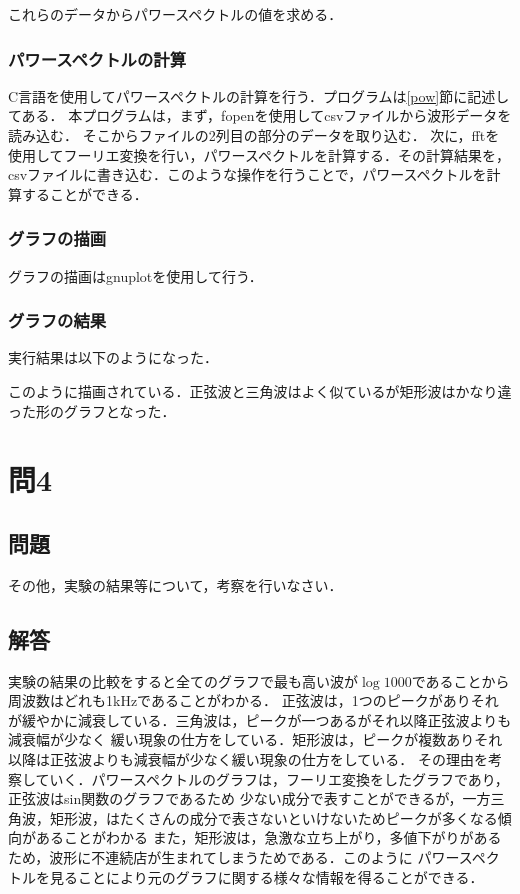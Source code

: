 これらのデータからパワースペクトルの値を求める．
\subsubsection{パワースペクトルの計算}
C言語を使用してパワースペクトルの計算を行う．プログラムは\ref{pow}節に記述してある．
本プログラムは，まず，fopenを使用してcsvファイルから波形データを読み込む．
そこからファイルの2列目の部分のデータを取り込む．
次に，fftを使用してフーリエ変換を行い，パワースペクトルを計算する．その計算結果を，
csvファイルに書き込む．このような操作を行うことで，パワースペクトルを計算することができる．
\subsubsection{グラフの描画}
グラフの描画はgnuplotを使用して行う．
\subsubsection{グラフの結果}
実行結果は以下のようになった．

このように描画されている．正弦波と三角波はよく似ているが矩形波はかなり違った形のグラフとなった．
    \section{問4} \label{sec:absatract}
\subsection{問題}
その他，実験の結果等について，考察を行いなさい．
\subsection{解答}
実験の結果の比較をすると全てのグラフで最も高い波が$\log 1000$であることから周波数はどれも1kHzであることがわかる．
正弦波は，1つのピークがありそれが緩やかに減衰している．三角波は，ピークが一つあるがそれ以降正弦波よりも減衰幅が少なく
緩い現象の仕方をしている．矩形波は，ピークが複数ありそれ以降は正弦波よりも減衰幅が少なく緩い現象の仕方をしている．
その理由を考察していく．パワースペクトルのグラフは，フーリエ変換をしたグラフであり，正弦波はsin関数のグラフであるため
少ない成分で表すことができるが，一方三角波，矩形波，はたくさんの成分で表さないといけないためピークが多くなる傾向があることがわかる
また，矩形波は，急激な立ち上がり，多値下がりがあるため，波形に不連続店が生まれてしまうためである．このように
パワースペクトルを見ることにより元のグラフに関する様々な情報を得ることができる．

